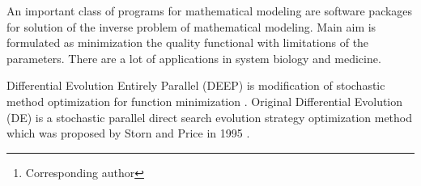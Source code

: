 \documentclass[12pt, a4paper]{article} %
\begin{document}

\renewcommand{\abstractname}{\large
    Method development of Differential Evolution
    for search mathematical model's options}
\begin{abstract}
    \normalsize %
    \bigskip %
    \noindent A.~V.~Svichkarev\footnote[*]{Corresponding author}, K.~N.~Kozlov \\
    \noindent Peter the Great St.Petersburg Polytechnic University,
St.Petersburg, Russia \\
    \noindent e-mail: svichkarev.anatoly@gmail.com \\
\end{abstract}

An important class of programs
for mathematical modeling are
software packages for solution
of the inverse problem of mathematical modeling.
Main aim is formulated as
minimization the quality functional
with limitations of the parameters.
There are a lot of applications
in system biology and medicine.

Differential Evolution Entirely Parallel (DEEP)
is modification of stochastic method optimization
for function minimization \cite{Kozlov11}.
Original Differential Evolution (DE)
is a stochastic parallel direct search
evolution strategy optimization method
which was proposed by Storn and Price in 1995 \cite{Storn95}. 

\vfill

 
\end{document}
